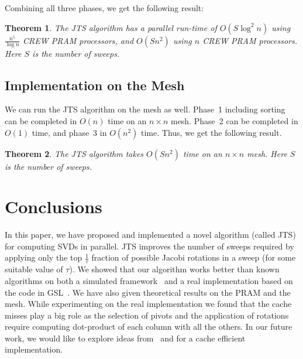 \documentclass[10pt, conference, compsocconf]{IEEEtran}
\newtheorem{theorem}{Theorem}
\begin{document}
Combining all three phases, we get the following result:

\begin{theorem}
The JTS algorithm has a parallel run-time of $O(S\log^2n)$ using $\frac{n^5}{\log n}$ CREW PRAM processors, and $O(Sn^2)$ using $n$ CREW PRAM processors. Here $S$ is the number of sweeps.
\end{theorem}

\subsection{Implementation on the Mesh}
We can run the JTS algorithm on the mesh as well. Phase~1 including sorting can be completed in $O(n)$ time on an $n\times n$ mesh. Phase~2 can be completed in $O(1)$ time, and phase~3 in $O(n^2)$ time. Thus, we get the following result.

\begin{theorem}
The JTS algorithm takes $O(Sn^2)$ time on an $n\times n$ mesh. Here $S$ is the number of sweeps.
\end{theorem}

\section{Conclusions}
\label{sec:conclude}

In this paper, we have proposed and implemented a novel algorithm (called JTS) for computing SVDs in parallel. JTS improves the number of sweeps required by applying only the top $\frac{1}{\tau}$ fraction of possible Jacobi rotations in a sweep (for some suitable value of $\tau$). We showed that our algorithm works better than known algorithms on both a simulated framework~\cite{rajasekaran2008relaxation} and a real implementation based on the code in GSL~\cite{galassi1996gnu}. We have also given theoretical results on the PRAM and the mesh. While experimenting on the real implementation we found that the cache misses play a big role as the selection of pivots and the application of rotations require computing dot-product of each column with all the others. In our future work, we would like to explore ideas from~\cite{haidar2013improved} and \cite{soliman2008memory} for a cache efficient implementation.
\end{document}

